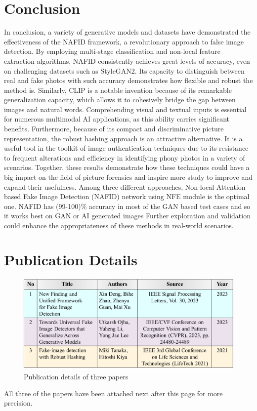 \documentclass[a4paper,14pt]{report}
\begin{document}
\chapter{Conclusion}
In conclusion, a variety of generative models and datasets have demonstrated the effectiveness of the NAFID framework, a revolutionary approach to false image detection. By employing multi-stage classification and non-local feature extraction algorithms, NAFID consistently achieves great levels of accuracy, even on challenging datasets such as StyleGAN2. Its capacity to distinguish between real and fake photos with such accuracy demonstrates how flexible and robust the method is. Similarly, CLIP is a notable invention because of its remarkable generalization capacity, which allows it to cohesively bridge the gap between images and natural words. Comprehending visual and textual inputs is essential for numerous multimodal AI applications, as this ability carries significant benefits. Furthermore, because of its compact and discriminative picture representation, the robust hashing approach is an attractive alternative. It is a useful tool in the toolkit of image authentication techniques due to its resistance to frequent alterations and efficiency in identifying phony photos in a variety of scenarios. Together, these results demonstrate how these techniques could have a big impact on the field of picture forensics and inspire more study to improve and expand their usefulness.
Among three different approaches, Non-local Attention based Fake Image Detection (NAFID) network using NFE module is the optimal one. NAFID \cite{1} has (99-100)\% accuracy in most of the GAN based test cases and so it works best on GAN or AI generated images 
Further exploration and validation could enhance the appropriateness of these methods in real-world scenarios.

\renewcommand{\bibname}{References}

\chapter{Publication Details}
\begin{figure}[H]
    \centering
    \includegraphics[width=1\textwidth]{Images/publications.png}
    \caption{Publication details of three papers}
    \label{fig:rainy_clean}
\end{figure}
All three of the papers have been attached next after this page for more precision.
\end{document}
